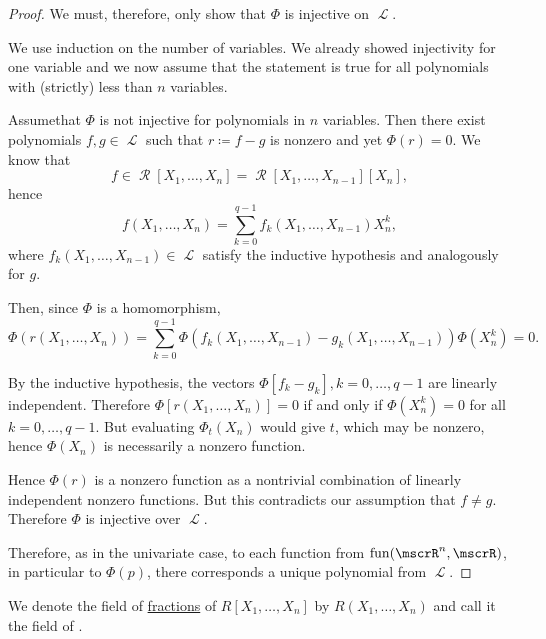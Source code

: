\begin{proof}
  We must, therefore, only show that \( \Phi \) is injective on \( \mscrL \).

  We use induction on the number of variables. We already showed injectivity for one variable and we now assume that the statement is true for all polynomials with (strictly) less than \( n \) variables.

  Assume\DNE that \( \Phi \) is not injective for polynomials in \( n \) variables. Then there exist polynomials \( f, g \in \mscrL \) such that \( r \coloneqq f - g \) is nonzero and yet \( \Phi(r) = 0 \). We know that
  \begin{equation*}
    f \in \mscrR[X_1, \ldots, X_n] = \mscrR[X_1, \ldots, X_{n-1}][X_n],
  \end{equation*}
  hence
  \begin{equation*}
    f(X_1, \ldots, X_n) = \sum_{k=0}^{q-1} f_k(X_1, \ldots, X_{n-1}) X_n^k,
  \end{equation*}
  where \( f_k(X_1, \ldots, X_{n-1}) \in \mscrL \) satisfy the inductive hypothesis and analogously for \( g \).

  Then, since \( \Phi \) is a homomorphism,
  \begin{equation*}
    \Phi(r(X_1, \ldots, X_n)) = \sum_{k=0}^{q-1} \Phi(f_k(X_1, \ldots, X_{n-1}) - g_k(X_1, \ldots, X_{n-1})) \Phi(X_n^k) = 0.
  \end{equation*}

  By the inductive hypothesis, the vectors \( \Phi[f_k - g_k], k = 0, \ldots, q - 1 \) are linearly independent. Therefore \( \Phi[r(X_1, \ldots, X_n)] = 0 \) if and only if \( \Phi(X_n^k) = 0 \) for all \( k = 0, \ldots, q - 1 \). But evaluating \( \Phi_t(X_n) \) would give \( t \), which may be nonzero, hence \( \Phi(X_n) \) is necessarily a nonzero function.

  Hence \( \Phi(r) \) is a nonzero function as a nontrivial combination of linearly independent nonzero functions. But this contradicts our assumption that \( f \neq g \). Therefore \( \Phi \) is injective over \( \mscrL \).

  Therefore, as in the univariate case, to each function from \( \fun(\mscrR^n, \mscrR) \), in particular to \( \Phi(p) \), there corresponds a unique polynomial from \( \mscrL \).
\end{proof}

\begin{definition}\label{def:rational_algebraic_function}
  We denote the field of \hyperref[def:field_of_fractions]{fractions} of \( R[X_1, \ldots, X_n] \) by \( R(X_1, \ldots, X_n) \) and call it the field of .
\end{definition}

